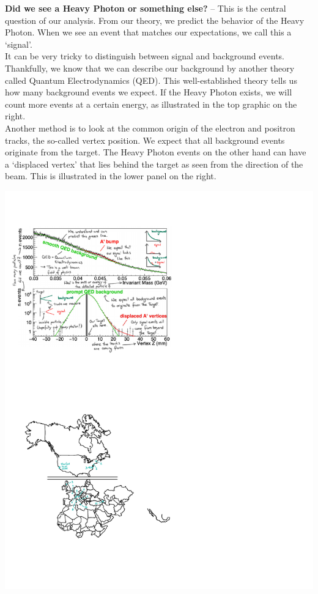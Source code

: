 \begin{poster}
{\begin{minipage}{0.33\columnwidth}
			\end{minipage}
			\begin{minipage}{0.54\columnwidth}
				\textbf{Did we see a Heavy Photon or something else?} -- This is the central question of our analysis. From our theory, we predict the behavior of the Heavy Photon. When we see an event that matches our expectations, we call this a `signal'.\\
				It can be very tricky to distinguish between signal and background events. Thankfully, we know that we can describe our background by another theory called Quantum Electrodynamics (QED). This well-established theory tells us how many background events we expect. If the Heavy Photon exists, we will count more events at a certain energy, as illustrated in the top graphic on the right.\\
				Another method is to look at the common origin of the electron and positron tracks, the so-called vertex position. We expect that all background events originate from the target. The Heavy Photon events on the other hand can have a `displaced vertex' that lies behind the target as seen from the direction of the beam. This is illustrated in the lower panel on the right.
			\end{minipage}%
			\hspace{0.02\columnwidth}%
			\begin{minipage}{0.44\columnwidth}
				\includegraphics[width=\columnwidth]{figs/signalExplanation.pdf}
			\end{minipage}
		}


\end{poster}
